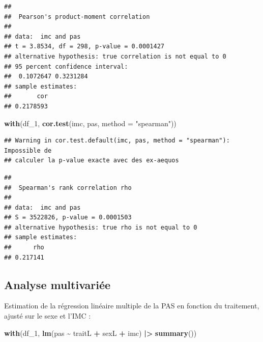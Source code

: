 \documentclass[
]{book}
\newenvironment{Shaded}{\begin{snugshade}}{\end{snugshade}}
\newcommand{\AttributeTok}[1]{\textcolor[rgb]{0.13,0.29,0.53}{#1}}
\newcommand{\FunctionTok}[1]{\textcolor[rgb]{0.13,0.29,0.53}{\textbf{#1}}}
\newcommand{\NormalTok}[1]{#1}
\newcommand{\SpecialCharTok}[1]{\textcolor[rgb]{0.81,0.36,0.00}{\textbf{#1}}}
\newcommand{\StringTok}[1]{\textcolor[rgb]{0.31,0.60,0.02}{#1}}
\begin{document}
\begin{verbatim}
## 
##  Pearson's product-moment correlation
## 
## data:  imc and pas
## t = 3.8534, df = 298, p-value = 0.0001427
## alternative hypothesis: true correlation is not equal to 0
## 95 percent confidence interval:
##  0.1072647 0.3231284
## sample estimates:
##       cor 
## 0.2178593
\end{verbatim}

\begin{Shaded}
\begin{Highlighting}[]
\FunctionTok{with}\NormalTok{(df\_1,}
     \FunctionTok{cor.test}\NormalTok{(imc, pas, }\AttributeTok{method =} \StringTok{"spearman"}\NormalTok{))}
\end{Highlighting}
\end{Shaded}

\begin{verbatim}
## Warning in cor.test.default(imc, pas, method = "spearman"): Impossible de
## calculer la p-value exacte avec des ex-aequos
\end{verbatim}

\begin{verbatim}
## 
##  Spearman's rank correlation rho
## 
## data:  imc and pas
## S = 3522826, p-value = 0.0001503
## alternative hypothesis: true rho is not equal to 0
## sample estimates:
##      rho 
## 0.217141
\end{verbatim}

\subsection{Analyse multivariée}\label{analyse-multivariuxe9e-1}

Estimation de la régression linéaire multiple de la PAS en fonction du traitement, ajusté sur le sexe et l'IMC :

\begin{Shaded}
\begin{Highlighting}[]
\FunctionTok{with}\NormalTok{(df\_1,}
     \FunctionTok{lm}\NormalTok{(pas }\SpecialCharTok{\textasciitilde{}}\NormalTok{ traitL }\SpecialCharTok{+}\NormalTok{ sexL }\SpecialCharTok{+}\NormalTok{ imc) }\SpecialCharTok{|\textgreater{}}
       \FunctionTok{summary}\NormalTok{())}
\end{Highlighting}
\end{Shaded}
\end{document}

